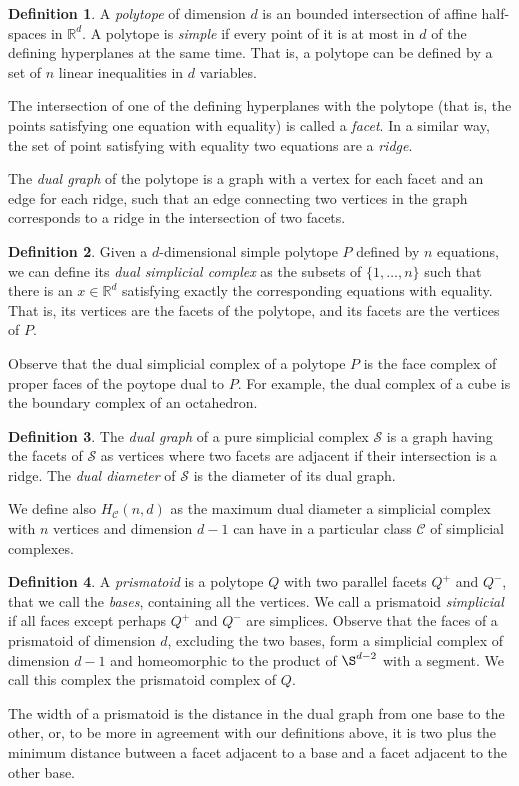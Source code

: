 \documentclass[12pt,a4paper]{article}
\theoremstyle{plain}
\theoremstyle{definition}
\newtheorem{definition}{Definition}
\begin{document}
\begin{definition}
  A \emph{polytope} of dimension $d$ is an bounded intersection of affine half-spaces in $\mathbb{R}^d$. A polytope is \emph{simple} if every point of it is at most in $d$ of the defining hyperplanes at the same time. That is, a polytope can be defined by a set of $n$ linear inequalities in $d$ variables.
  
  The intersection of one of the defining hyperplanes with the polytope (that is, the points satisfying one equation with equality) is called a \emph{facet}. In a similar way, the set of point satisfying with equality two equations are a \emph{ridge}.
  
  The \emph{dual graph} of the polytope is a graph with a vertex for each facet and an edge for each ridge, such that an edge connecting two vertices in the graph corresponds to a ridge in the intersection of two facets.
\end{definition}

\begin{definition}
  Given a $d$-dimensional simple polytope $P$ defined by $n$ equations, we can define its \emph{dual simplicial complex} as the subsets of $\{1,\dots,n\}$ such that there is an $x\in\mathbb{R}^d$ satisfying exactly the corresponding equations with equality. That is, its vertices are the facets of the polytope, and its facets are the vertices of $P$. 
\end{definition}

Observe that the dual simplicial complex of a polytope $P$ is the face complex of proper faces of the poytope dual to $P$. For example, the dual complex of a cube is the boundary complex of an octahedron.

\begin{definition}
  The \emph{dual graph} of a pure simplicial complex $\mathcal{S}$ is a graph having the facets of $\mathcal{S}$ as vertices where two facets are adjacent if their intersection is a ridge. The \emph{dual diameter} of $\mathcal{S}$ is the diameter of its dual graph.

  We define also $H_\mathcal{C}(n,d)$ as the maximum dual diameter a simplicial complex with $n$ vertices and dimension $d-1$ can have in a particular class $\mathcal{C}$ of simplicial complexes.
\end{definition}

\begin{definition}
  A \emph{prismatoid} is a polytope $Q$ with two parallel facets $Q^+$ and $Q^-$, that we call the \emph{bases}, containing all the vertices. We call a prismatoid \emph{simplicial} if all faces except perhaps $Q^+$ and $Q^-$ are simplices. Observe that the faces of a prismatoid of dimension $d$, excluding the two bases, form a simplicial complex of dimension $d-1$ and homeomorphic to the product of $\S^{d-2}$ with a segment. We call this complex the prismatoid complex of $Q$.
  
  The width of a prismatoid is the distance in the dual graph from one base to the other, or, to be more in agreement with our definitions above, it is two plus the minimum distance butween a facet adjacent to a base and a facet adjacent to the other base.
\end{definition}
\end{document}
